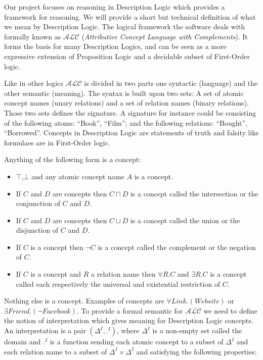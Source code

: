 Our project focuses on reasoning in Description Logic which provides a
framework for reasoning. We will provide a short but technical
definition of what we mean by Description Logic. The logical framework
the software deals with formally known as $\mathcal{ALC}$
(\textit{Attributive Concept Language with Complements}). It forms the
basis for many Description Logics, and can be seen as a more expressive
extension of Proposition Logic and a decidable subset of First-Order
logic.

Like in other logics $\mathcal{ALC}$ is divided in two parts one
syntactic (language) and the other semantic (meaning). The
syntax is built upon two sets: A set of atomic concept names (unary
relations) and a set of relation names (binary relations). Those two
sets defines the signature. A signature for instance could be
consisting of the following atoms: ``Book'', ``Film''; and the
following relations: ``Bought'', ``Borrowed''. Concepts in Description
Logic are statements of truth and falsity like formulaes are in
First-Order logic. 

Anything of the following form is a concept:
\begin{itemize}
\item $\top$,$\bot$ and any atomic concept name $A$ is a concept.
\item If $C$ and $D$ are concepts then $C \sqcap D$ is a concept
  called the intersection or the conjunction of $C$ and $D$.
\item If $C$ and $D$ are concepts then $C \sqcup D$ is a concept
  called the union or the disjunction of $C$ and $D$.
\item If $C$ is a concept then $\neg C$ is a concept called the complement or the
  negation of $C$.
\item If $C$ is a concept and $R$ a relation name then $\forall R . C$
  and $\exists R . C$ is a concept called each respectively the
  universal and existential restriction of $C$.
\end{itemize}

Nothing else is a concept. Examples of concepts are $\forall Link
. (Website)$ or $\exists Friend . (\neg Facebook)$. To provide a
formal semantic for $\mathcal{ALC}$ we need to define the notion of
interpretation which gives meaning for Description Logic concepts. An
interpretation is a pair $(\Delta^{I},.^{I})$, where $\Delta^{I}$ is a
non-empty set called the domain and $.^{I}$ is a function sending each
atomic concept to a subset of $\Delta^{I}$ and each relation name to a
subset of $\Delta^{I} \times \Delta^{I}$ and satisfying the following 
properties:

